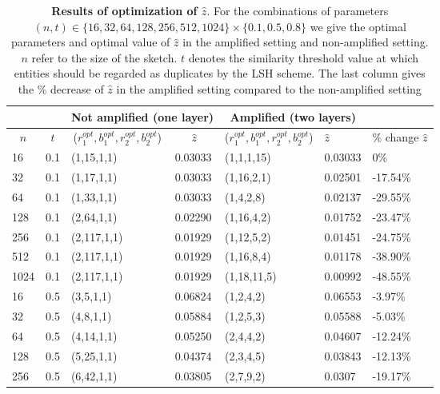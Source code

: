 \begin{table}
    \centering
    \caption[Results of optimization of $\hat{z}$]{\textbf{Results of optimization of $\hat{z}$}. For the combinations of parameters $(n,t)\in \{16,32,64,128,256,512,1024\} \times \{0.1,0.5,0.8\}$ we give the optimal parameters and optimal value of $\hat{z}$ in the amplified setting and non-amplified setting. $n$ refer to the size of the sketch. $t$ denotes the similarity threshold value at which entities should be regarded as duplicates by the LSH scheme. The last column gives the \% decrease of $\hat{z}$ in the amplified setting compared to the non-amplified setting}
    \begin{tabular}{l|l|l|l|l|l|l}
        \multicolumn{1}{c}{} & \multicolumn{1}{c}{}  & \multicolumn{2}{c}{Not amplified (one layer)} & \multicolumn{2}{c}{Amplified (two layers)}  & \\
        \hline
        \multicolumn{1}{c}{$n$} & \multicolumn{1}{c}{$t$} & \multicolumn{1}{c}{($r_1^{opt},b_1^{opt},r_2^{opt},b_2^{opt}$)} & \multicolumn{1}{c}{$\hat{z}$} & \multicolumn{1}{c}{($r_1^{opt},b_1^{opt},r_2^{opt},b_2^{opt}$)} & $\hat{z}$ &  \% change $\hat{z}$      \\
        \hline
        16 & 0.1 & (1,15,1,1) & 0.03033 & (1,1,1,15) & 0.03033 & 0\%  \\
        32 & 0.1& (1,17,1,1) & 0.03033 & (1,16,2,1) & 0.02501& -17.54\%  \\
        64 & 0.1& (1,33,1,1)& 0.03033 & (1,4,2,8) & 0.02137&  -29.55\%  \\
        128 & 0.1 & (2,64,1,1) & 0.02290 & (1,16,4,2)  & 0.01752& -23.47\% \\
        256 & 0.1 & (2,117,1,1) & 0.01929 & (1,12,5,2) & 0.01451 & -24.75\% \\
        512 & 0.1 & (2,117,1,1) & 0.01929 & (1,16,8,4) & 0.01178 & -38.90\% \\
        1024 & 0.1 & (2,117,1,1) & 0.01929 & (1,18,11,5) & 0.00992 & -48.55\% \\
        \hline
        16 & 0.5 & (3,5,1,1) & 0.06824 & (1,2,4,2) & 0.06553 & -3.97\%  \\
        32 & 0.5& (4,8,1,1) & 0.05884 & (1,2,5,3) & 0.05588& -5.03\%  \\
        64 & 0.5& (4,14,1,1)& 0.05250 & (2,4,4,2) & 0.04607&  -12.24\%  \\
        128 & 0.5 & (5,25,1,1) & 0.04374 &  (2,3,4,5) & 0.03843& -12.13\% \\
        256 & 0.5 & (6,42,1,1) & 0.03805 & (2,7,9,2) & 0.0307 & -19.17\% \\

\end{tabular}
\end{table}
